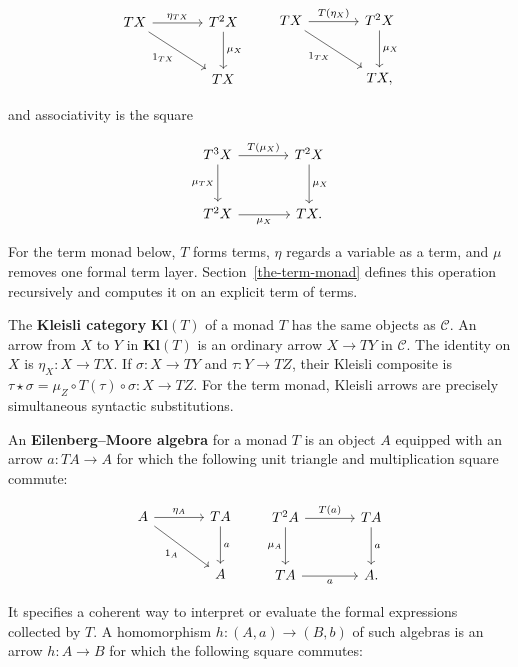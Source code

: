 \documentclass[11pt]{article}
\theoremstyle{definition}
\begin{document}
\[
\begin{tikzcd}[row sep=large,column sep=large]
T X \arrow[r,"\eta_{T X}"] \arrow[dr,"1_{T X}"'] &
T^2X \arrow[d,"\mu_X"] \\
& T X
\end{tikzcd}
\qquad
\begin{tikzcd}[row sep=large,column sep=large]
T X \arrow[r,"T(\eta_X)"] \arrow[dr,"1_{T X}"'] &
T^2X \arrow[d,"\mu_X"] \\
& T X,
\end{tikzcd}
\]

and associativity is the square

\[
\begin{tikzcd}[row sep=large,column sep=large]
T^3X \arrow[r,"T(\mu_X)"] \arrow[d,"\mu_{T X}"'] &
T^2X \arrow[d,"\mu_X"] \\
T^2X \arrow[r,"\mu_X"'] & T X.
\end{tikzcd}
\]

For the term monad below, \(T\) forms terms, \(\eta\) regards a variable as a
term, and \(\mu\) removes one formal term layer. Section~\ref{the-term-monad}
defines this operation recursively and computes it on an explicit term of
terms.

The \textbf{Kleisli category} \(\mathbf{Kl}(T)\) of a monad \(T\) has
the same objects as \(\mathcal C\). An arrow from \(X\) to \(Y\) in
\(\mathbf{Kl}(T)\) is an ordinary arrow \(X\to TY\) in \(\mathcal C\).
The identity on \(X\) is \(\eta_X:X\to TX\). If
\(\sigma:X\to TY\) and \(\tau:Y\to TZ\), their Kleisli composite is
\(\tau\star\sigma=\mu_Z\circ T(\tau)\circ\sigma:X\to TZ\). For the term
monad, Kleisli arrows are precisely simultaneous syntactic substitutions.

An \textbf{Eilenberg--Moore algebra} for a monad \(T\) is an object
\(A\) equipped with an arrow \(a:TA\to A\) for which the following unit
triangle and multiplication square commute:

\[
\begin{tikzcd}[row sep=large,column sep=large]
A \arrow[r,"\eta_A"] \arrow[dr,"1_A"'] & T A \arrow[d,"a"] \\
& A
\end{tikzcd}
\qquad
\begin{tikzcd}[row sep=large,column sep=large]
T^2A \arrow[r,"T(a)"] \arrow[d,"\mu_A"'] &
T A \arrow[d,"a"] \\
T A \arrow[r,"a"'] & A.
\end{tikzcd}
\]

It specifies a coherent way to interpret or evaluate the formal expressions
collected by \(T\). A homomorphism \(h:(A,a)\to(B,b)\) of such algebras is
an arrow \(h:A\to B\) for which the following square commutes:
\end{document}
